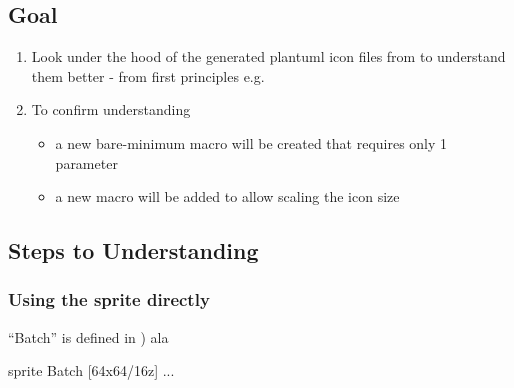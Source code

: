 \documentclass[letterpaper,10pt,english]{sphinxmanual}
\begin{document}
\subsection{Goal}
\label{\detokenize{StdlibUnderTheHood/StdlibUnderstanding:goal}}\begin{enumerate}
%
\item {} 
Look under the hood of the generated plantuml icon files from
 to understand them
better - from first principles e.g.

\item {} 
To confirm understanding
\begin{itemize}
\item {} 
a new bare-minimum macro will be created that requires only 1 parameter 

\item {} 
a new macro will be added to allow scaling the icon size

\end{itemize}

\end{enumerate}


\subsection{Steps to Understanding}
\label{\detokenize{StdlibUnderTheHood/StdlibUnderstanding:steps-to-understanding}}

\subsubsection{Using the sprite directly}
\label{\detokenize{StdlibUnderTheHood/StdlibUnderstanding:using-the-sprite-directly}}
“Batch” is defined in
)
ala

\begin{sphinxVerbatim}[commandchars=\\\{\}]
sprite \PYGZdl{}Batch [64x64/16z] \PYGZob{}...
\end{sphinxVerbatim}

\begin{figure}[htbp]
\centering

\end{figure}
\end{document}
